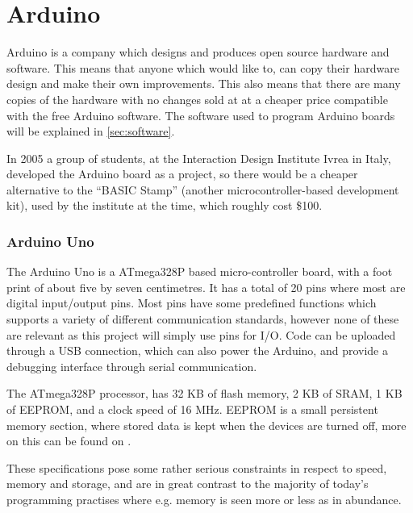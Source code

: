 
\section{Arduino}\label{sec:arduino}
Arduino is a company which designs and produces open source hardware and software.
This means that anyone which would like to, can copy their hardware design and make their own improvements.
This also means that there are many copies of the hardware with no changes sold at at a cheaper price compatible with the free Arduino software.
The software used to program Arduino boards will be explained in \ref{sec:software}.

\begin{tcolorbox}[floatplacement=b,float,colback=white!5,colframe=aaublue!50,title=The Birth of the Arduino \cite{birthofarduino}.]
In 2005 a group of students, at the Interaction Design Institute Ivrea in Italy, developed the Arduino board as a project, so there would be a cheaper alternative to the ``BASIC Stamp'' (another microcontroller-based development kit), used by the institute at the time, which roughly cost \$100.
\end{tcolorbox}

\subsubsection{Arduino Uno}
The Arduino Uno is a ATmega328P based micro-controller board, with a foot print of about five by seven centimetres.
It has a total of 20 pins where most are digital input/output pins.
Most pins have some predefined functions which supports a variety of different communication standards, however none of these are relevant as this project will simply use pins for I/O.
Code can be uploaded through a USB connection, which can also power the Arduino, and provide a debugging interface through serial communication.

The ATmega328P processor, has 32 KB of flash memory, 2 KB of SRAM, 1 KB of EEPROM, and a clock speed of 16 MHz.
EEPROM is a small persistent memory section, where stored data is kept when the devices are turned off, more on this can be found on \cite{EEPROM}.

These specifications pose some rather serious constraints in respect to speed, memory and storage, and are in great contrast to the majority of today's programming practises where e.g. memory is seen more or less as in abundance.